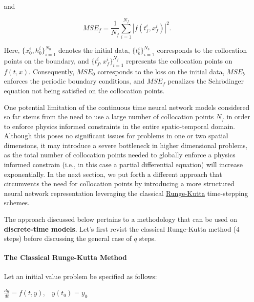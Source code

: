 \documentclass[book.tex]{subfiles}
\begin{document}
\begin{example}
and

\begin{equation}
MSE_f = \frac{1}{N_f}\sum_{i=1}^{N_f}|f(t_f^i,x_f^i)|^2.    
\end{equation}



Here, $\{x_0^i, h^i_0\}_{i=1}^{N_0}$ denotes the initial data, $\{t^i_b\}_{i=1}^{N_b}$ corresponds to the collocation points on the boundary, and $\{t_f^i,x_f^i\}_{i=1}^{N_f}$ represents the collocation points on $f(t,x)$. Consequently, $MSE_0$ corresponds to the loss on the initial data, $MSE_b$ enforces the periodic boundary conditions, and $MSE_f$ penalizes the Schr$\mathrm{\ddot{o}}$dinger equation not being satisfied on the collocation points.
\end{example}


One potential limitation of the continuous time neural network models considered so far stems from the need to use a large number of collocation points $N_f$ in order to enforce physics informed constraints in the entire spatio-temporal domain. Although this poses no significant issues for problems in one or two spatial dimensions, it may introduce a severe bottleneck in higher dimensional problems, as the total number of collocation points needed to globally enforce a physics informed constrain (i.e., in this case a partial differential equation) will increase exponentially. In the next section, we put forth a different approach that circumvents the need for collocation points by introducing a more structured neural network representation leveraging the classical \href{https://en.wikipedia.org/wiki/Runge–Kutta_methods}{Runge-Kutta} time-stepping schemes.




The approach discussed below pertains to a methodology that can be used on \textbf{discrete-time models}. Let's first revist the classical Runge-Kutta method (4 steps) before discussing the general case of $q$ steps.  

\paragraph{The Classical Runge-Kutta
Method}\label{the-classical-runge-kutta-method}

Let an initial value problem be specified as follows:

$\frac{dy}{dt}=f(t,y)$,$\quad y(t_{0})=y_{0}$
\end{document}
